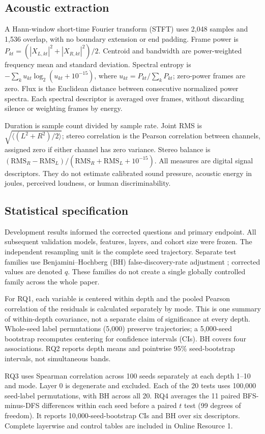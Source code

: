 \documentclass[pdflatex,iicol,sn-basic,Numbered]{sn-jnl}
\begin{document}
\subsection{Acoustic extraction}
A Hann-window short-time Fourier transform (STFT) uses 2,048 samples and 1,536 overlap, with no boundary extension or end padding. Frame power is $P_{kt}=(|X_{L,kt}|^2+|X_{R,kt}|^2)/2$. Centroid and bandwidth are power-weighted frequency mean and standard deviation. Spectral entropy is $-\sum_k u_{kt}\log_2(u_{kt}+10^{-15})$, where $u_{kt}=P_{kt}/\sum_kP_{kt}$; zero-power frames are zero. Flux is the Euclidean distance between consecutive normalized power spectra. Each spectral descriptor is averaged over frames, without discarding silence or weighting frames by energy.

Duration is sample count divided by sample rate. Joint RMS is $\sqrt{\langle(L^2+R^2)/2\rangle}$; stereo correlation is the Pearson correlation between channels, assigned zero if either channel has zero variance. Stereo balance is $(\mathrm{RMS}_R-\mathrm{RMS}_L)/(\mathrm{RMS}_R+\mathrm{RMS}_L+10^{-15})$. All measures are digital signal descriptors. They do not estimate calibrated sound pressure, acoustic energy in joules, perceived loudness, or human discriminability.

\subsection{Statistical specification}
Development results informed the corrected questions and primary endpoint. All subsequent validation models, features, layers, and cohort size were frozen. The independent resampling unit is the complete seed trajectory. Separate test families use Benjamini--Hochberg (BH) false-discovery-rate adjustment \citep{Benjamini1995}; corrected values are denoted $q$. These families do not create a single globally controlled family across the whole paper.

For RQ1, each variable is centered within depth and the pooled Pearson correlation of the residuals is calculated separately by mode. This is one summary of within-depth covariance, not a separate claim of significance at every depth. Whole-seed label permutations (5,000) preserve trajectories; a 5,000-seed bootstrap recomputes centering for confidence intervals (CIs). BH covers four associations. RQ2 reports depth means and pointwise 95\% seed-bootstrap intervals, not simultaneous bands.

RQ3 uses Spearman correlation across 100 seeds separately at each depth 1--10 and mode. Layer 0 is degenerate and excluded. Each of the 20 tests uses 100,000 seed-label permutations, with BH across all 20. RQ4 averages the 11 paired BFS-minus-DFS differences within each seed before a paired $t$ test (99 degrees of freedom). It reports 10,000-seed-bootstrap CIs and BH over six descriptors. Complete layerwise and control tables are included in Online Resource 1.
\end{document}
